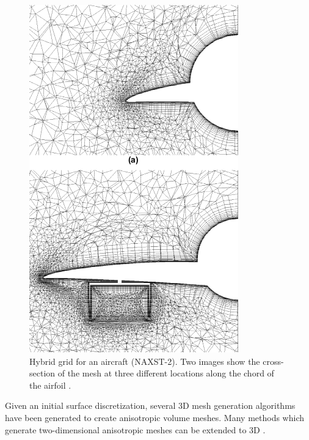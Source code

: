\begin{figure}
\begin{minipage}{0.45\linewidth}
	\includegraphics[width=\linewidth]{img/intro/lit/ito.png}
	\caption{Hybrid grid for an aircraft (NAXST-2). Two images show the cross-section of the mesh at three different locations along the chord of the airfoil \cite{ito2002unstructured}.}
	\label{fig-ito}
\end{minipage}
\end{figure}

Given an initial surface discretization, several 3D mesh generation algorithms have been generated to create anisotropic volume meshes. Many methods which generate two-dimensional anisotropic  meshes can be extended to 3D \cite{lohner1993matching, nakahashi1987fdm,castro1997anisotropic}.

